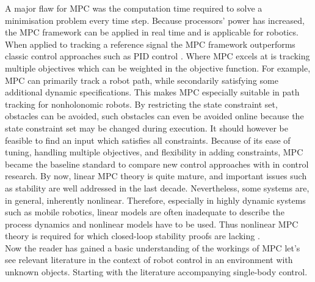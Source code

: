 A major flaw for \ac{MPC} was the computation time required to solve a minimisation problem every time step. Because processors' power has increased, the \ac{MPC} framework can be applied in real time and is applicable for robotics. When applied to tracking a reference signal the \ac{MPC} framework outperforms classic control approaches such as \ac{PID} control \cite{nascimento_nonholonomic_2018}. Where \ac{MPC} excels at is tracking multiple objectives which can be weighted in the objective function. For example, \ac{MPC} can primarily track a robot path, while secondarily satisfying some additional dynamic specifications. This makes \ac{MPC} especially suitable in path tracking for nonholonomic robots. By restricting the state constraint set, obstacles can be avoided, such obstacles can even be avoided online  because the state constraint set may be changed during execution. It should however be feasible to find an input which satisfies all constraints. Because of its ease of tuning, handling multiple objectives, and flexibility in adding constraints, \ac{MPC} became the baseline standard to compare new control approaches with in control research. By now, linear \ac{MPC} theory is quite mature, and important issues
such as stability are well addressed in the last decade. Nevertheless, some systems are, in general,
inherently nonlinear. Therefore, especially in highly dynamic systems such as mobile robotics, linear
models are often inadequate to describe the process dynamics and nonlinear models have to be used. Thus nonlinear \ac{MPC} theory is required for which closed-loop stability proofs are lacking \cite{nascimento_nonholonomic_2018}. \\

Now the reader has gained a basic understanding of the workings of \ac{MPC} let's see relevant literature in the context of robot control in an environment with unknown objects. Starting with the literature accompanying single-body control.

